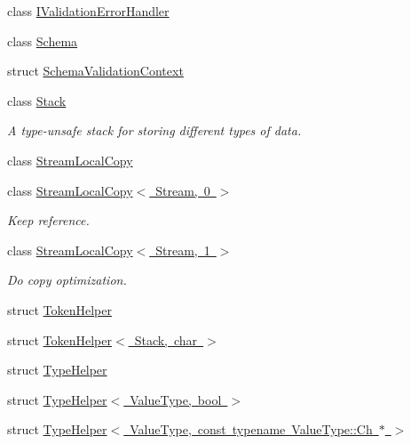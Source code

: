 \begin{DoxyCompactItemize}
\item 
class \mbox{\hyperlink{classrapidjson_1_1internal_1_1_i_validation_error_handler}{I\+Validation\+Error\+Handler}}
\item 
class \mbox{\hyperlink{classrapidjson_1_1internal_1_1_schema}{Schema}}
\item 
struct \mbox{\hyperlink{structrapidjson_1_1internal_1_1_schema_validation_context}{Schema\+Validation\+Context}}
\item 
class \mbox{\hyperlink{classrapidjson_1_1internal_1_1_stack}{Stack}}
\begin{DoxyCompactList}\small\item\em A type-\/unsafe stack for storing different types of data. \end{DoxyCompactList}\item 
class \mbox{\hyperlink{classrapidjson_1_1internal_1_1_stream_local_copy}{Stream\+Local\+Copy}}
\item 
class \mbox{\hyperlink{classrapidjson_1_1internal_1_1_stream_local_copy_3_01_stream_00_010_01_4}{Stream\+Local\+Copy$<$ Stream, 0 $>$}}
\begin{DoxyCompactList}\small\item\em Keep reference. \end{DoxyCompactList}\item 
class \mbox{\hyperlink{classrapidjson_1_1internal_1_1_stream_local_copy_3_01_stream_00_011_01_4}{Stream\+Local\+Copy$<$ Stream, 1 $>$}}
\begin{DoxyCompactList}\small\item\em Do copy optimization. \end{DoxyCompactList}\item 
struct \mbox{\hyperlink{structrapidjson_1_1internal_1_1_token_helper}{Token\+Helper}}
\item 
struct \mbox{\hyperlink{structrapidjson_1_1internal_1_1_token_helper_3_01_stack_00_01char_01_4}{Token\+Helper$<$ Stack, char $>$}}
\item 
struct \mbox{\hyperlink{structrapidjson_1_1internal_1_1_type_helper}{Type\+Helper}}
\item 
struct \mbox{\hyperlink{structrapidjson_1_1internal_1_1_type_helper_3_01_value_type_00_01bool_01_4}{Type\+Helper$<$ Value\+Type, bool $>$}}
\item 
struct \mbox{\hyperlink{structrapidjson_1_1internal_1_1_type_helper_3_01_value_type_00_01const_01typename_01_value_type_1_1_ch_01_5_01_4}{Type\+Helper$<$ Value\+Type, const typename Value\+Type\+::\+Ch $\ast$ $>$}}
\item 

\end{DoxyCompactItemize}
